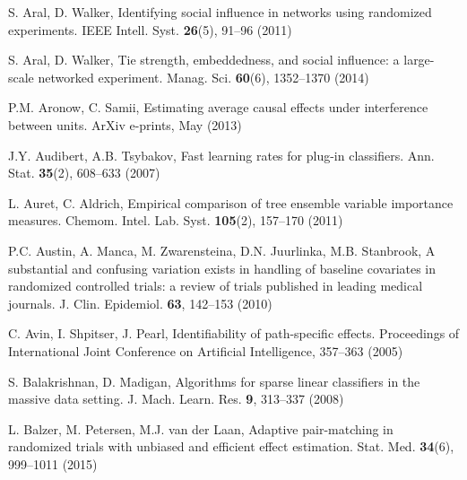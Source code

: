 \begin{list}{}{\setlength{\leftmargin}{2.1em}\setlength{\labelwidth}{0pt}
  \setlength{\labelsep}{0pt}\setlength{\itemindent}{-2.1em}
  \setlength{\parsep}{0pt}\setlength{\itemsep}{2pt}\setlength{\topsep}{0pt}}
\item\label{refentry:REF008}S. Aral, D. Walker, Identifying social influence in networks using randomized experiments. IEEE Intell. Syst. \textbf{26}(5), 91--96 (2011)\label{refend:REF008}
\item\label{refentry:REF009}S. Aral, D. Walker, Tie strength, embeddedness, and social influence: a large-scale networked experiment. Manag. Sci. \textbf{60}(6), 1352--1370 (2014)\label{refend:REF009}
\item\label{refentry:REF010}P.M. Aronow, C. Samii, Estimating average causal effects under interference between units. ArXiv e-prints, May (2013)\label{refend:REF010}
\item\label{refentry:REF011}J.Y. Audibert, A.B. Tsybakov, Fast learning rates for plug-in classifiers. Ann. Stat. \textbf{35}(2), 608--633 (2007)\label{refend:REF011}
\item\label{refentry:REF012}L. Auret, C. Aldrich, Empirical comparison of tree ensemble variable importance measures. Chemom. Intel. Lab. Syst. \textbf{105}(2), 157--170 (2011)\label{refend:REF012}
\item\label{refentry:REF013}P.C. Austin, A. Manca, M. Zwarensteina, D.N. Juurlinka, M.B. Stanbrook, A substantial and confusing variation exists in handling of baseline covariates in randomized controlled trials: a review of trials published in leading medical journals. J. Clin. Epidemiol. \textbf{63}, 142--153 (2010)\label{refend:REF013}
\item\label{refentry:REF014}C. Avin, I. Shpitser, J. Pearl, Identifiability of path-specific effects. Proceedings of International Joint Conference on Artificial Intelligence, 357--363 (2005)\label{refend:REF014}
\item\label{refentry:REF015}S. Balakrishnan, D. Madigan, Algorithms for sparse linear classifiers in the massive data setting. J. Mach. Learn. Res. \textbf{9}, 313--337 (2008)\label{refend:REF015}
\item\label{refentry:REF016}L. Balzer, M. Petersen, M.J. van der Laan, Adaptive pair-matching in randomized trials with unbiased and efficient effect estimation. Stat. Med. \textbf{34}(6), 999--1011 (2015)\label{refend:REF016}

\end{list}
